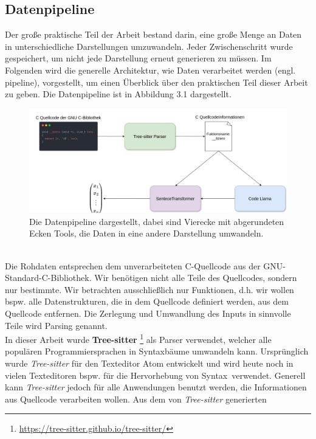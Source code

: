 \documentclass[12pt,letterpaper,ngerman]{article}
\begin{document}
\subsection{Datenpipeline}
Der große praktische Teil der Arbeit bestand darin, eine große 
Menge an Daten in unterschiedliche Darstellungen umzuwandeln. 
Jeder Zwischenschritt wurde gespeichert, um nicht jede Darstellung 
erneut generieren zu müssen. Im Folgenden wird die generelle Architektur,
wie Daten verarbeitet werden (engl. pipeline), vorgestellt, um einen 
Überblick über den praktischen Teil dieser Arbeit zu geben. Die 
Datenpipeline ist in Abbildung 3.1 dargestellt.
\begin{figure}
  \begin{center}
    \includegraphics[scale=0.35]{abb/data-pipeline-2.drawio.png}
  \end{center}
  \caption{
    Die Datenpipeline dargestellt, dabei 
    sind Vierecke mit abgerundeten Ecken Tools, die Daten in eine 
    andere Darstellung umwandeln.
  }
\end{figure}\\
Die Rohdaten entsprechen dem unverarbeiteten 
C-Quellcode aus der GNU-Standard-C-Bibliothek. 
Wir benötigen nicht alle Teile des Quellcodes, sondern nur bestimmte.
Wir betrachten ausschließlich nur Funktionen, d.h. wir wollen
bspw. alle Datenstrukturen, die in dem Quellcode definiert werden,
aus dem Quellcode entfernen. Die Zerlegung und Umwandlung des
Inputs in sinnvolle Teile wird Parsing genannt.\\
In dieser Arbeit wurde {\bf Tree-sitter} 
\footnote{\url{https://tree-sitter.github.io/tree-sitter/}} als
Parser verwendet, welcher
alle populären Programmiersprachen in Syntaxbäume umwandeln kann.
Ursprünglich wurde \textit{Tree-sitter} für den Texteditor Atom
entwickelt und wird heute noch in vielen Texteditoren bspw. 
für die Hervorhebung von Syntax verwendet. Generell kann 
\textit{Tree-sitter} jedoch
für alle Anwendungen benutzt werden, die Informationen aus Quellcode
verarbeiten wollen. Aus dem von \textit{Tree-sitter} generierten
\end{document}
